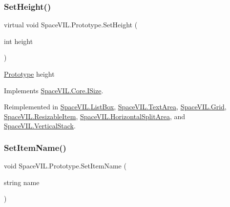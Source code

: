 \subsubsection{\texorpdfstring{Set\+Height()}{SetHeight()}}
{\footnotesize\ttfamily virtual void Space\+V\+I\+L.\+Prototype.\+Set\+Height (\begin{DoxyParamCaption}\item[{int}]{height }\end{DoxyParamCaption})\hspace{0.3cm}{\ttfamily [virtual]}}



\mbox{\hyperlink{class_space_v_i_l_1_1_prototype}{Prototype}} height 



Implements \mbox{\hyperlink{interface_space_v_i_l_1_1_core_1_1_i_size}{Space\+V\+I\+L.\+Core.\+I\+Size}}.



Reimplemented in \mbox{\hyperlink{class_space_v_i_l_1_1_list_box_a5b44bd011e83b56053b529cf55253296}{Space\+V\+I\+L.\+List\+Box}}, \mbox{\hyperlink{class_space_v_i_l_1_1_text_area_abb58c3f9396680f5d2c7f238c0d6e0bb}{Space\+V\+I\+L.\+Text\+Area}}, \mbox{\hyperlink{class_space_v_i_l_1_1_grid_a64c7b1987fb8823330dbeaea7420369c}{Space\+V\+I\+L.\+Grid}}, \mbox{\hyperlink{class_space_v_i_l_1_1_resizable_item_a9ffdafec963a452576589d3efc452356}{Space\+V\+I\+L.\+Resizable\+Item}}, \mbox{\hyperlink{class_space_v_i_l_1_1_horizontal_split_area_ab018f220de9d5f76f52d3068925d1bdf}{Space\+V\+I\+L.\+Horizontal\+Split\+Area}}, and \mbox{\hyperlink{class_space_v_i_l_1_1_vertical_stack_a1e2360b005a6fb8e503dc60d27f1f021}{Space\+V\+I\+L.\+Vertical\+Stack}}.

\mbox{\label{class_space_v_i_l_1_1_prototype_aa4827992b9c7a63aebec49322a7b862f}} 
\subsubsection{\texorpdfstring{Set\+Item\+Name()}{SetItemName()}}
{\footnotesize\ttfamily void Space\+V\+I\+L.\+Prototype.\+Set\+Item\+Name (\begin{DoxyParamCaption}\item[{string}]{name }\end{DoxyParamCaption})}



